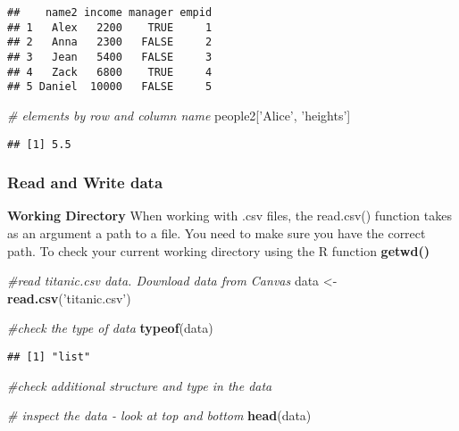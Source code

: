 \documentclass[
]{article}
\newenvironment{Shaded}{\begin{snugshade}}{\end{snugshade}}
\newcommand{\CommentTok}[1]{\textcolor[rgb]{0.56,0.35,0.01}{\textit{#1}}}
\newcommand{\KeywordTok}[1]{\textcolor[rgb]{0.13,0.29,0.53}{\textbf{#1}}}
\newcommand{\NormalTok}[1]{#1}
\newcommand{\StringTok}[1]{\textcolor[rgb]{0.31,0.60,0.02}{#1}}
\begin{document}
\begin{verbatim}
##    name2 income manager empid
## 1   Alex   2200    TRUE     1
## 2   Anna   2300   FALSE     2
## 3   Jean   5400   FALSE     3
## 4   Zack   6800    TRUE     4
## 5 Daniel  10000   FALSE     5
\end{verbatim}

\begin{Shaded}
\begin{Highlighting}[]
\CommentTok{# elements by row and column name}
\NormalTok{people2[}\StringTok{'Alice'}\NormalTok{, }\StringTok{'heights'}\NormalTok{]}
\end{Highlighting}
\end{Shaded}

\begin{verbatim}
## [1] 5.5
\end{verbatim}

\hypertarget{read-and-write-data}{%
\subsubsection{Read and Write data}\label{read-and-write-data}}

\textbf{Working Directory} When working with .csv files, the read.csv()
function takes as an argument a path to a file. You need to make sure
you have the correct path. To check your current working directory using
the R function \textbf{getwd()}

\begin{Shaded}
\begin{Highlighting}[]
\CommentTok{#read titanic.csv data. Download data from Canvas}
\NormalTok{data <-}\StringTok{ }\KeywordTok{read.csv}\NormalTok{(}\StringTok{'titanic.csv'}\NormalTok{)}

\CommentTok{#check the type of data}
\KeywordTok{typeof}\NormalTok{(data)}
\end{Highlighting}
\end{Shaded}

\begin{verbatim}
## [1] "list"
\end{verbatim}

\begin{Shaded}
\begin{Highlighting}[]
\CommentTok{#check additional structure and type in the data}


\CommentTok{# inspect the data - look at top and bottom}
\KeywordTok{head}\NormalTok{(data)}
\end{Highlighting}
\end{Shaded}
\end{document}
